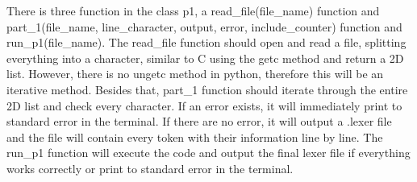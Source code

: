 \documentclass[11pt]{article}
\begin{document}
\newline
There is three function in the class p1, a read\_file(file\_name) function and part\_1(file\_name, line\_character, output, error, include\_counter) function and run\_p1(file\_name). The read\_file function should open and read a file, splitting everything into a character, similar to C using the getc method and return a 2D list. However, there is no ungetc method in python, therefore this will be an iterative method. Besides that, part\_1 function should iterate through the entire 2D list and check every character. If an error exists, it will immediately print to standard error in the terminal. If there are no error, it will output a .lexer file and the file will contain every token with their information line by line. The run\_p1 function will execute the code and output the final lexer file if everything works correctly or print to standard error in the terminal.
\end{document}
